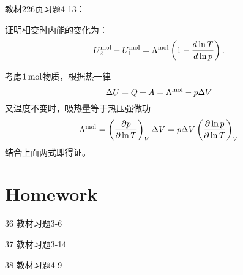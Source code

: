 \documentclass[CJK]{beamer}
\begin{document}
\begin{frame}
  \chtitle{\proid (\stwo)}
  \bch
  教材226页习题4-13：

  证明相变时内能的变化为：
  $$U_2^{\rm mol}-U^{\rm mol}_1 = \Lambda^{\rm mol}\left(1-\frac{d\ln T}{d\ln p}\right).$$
  \ech
\end{frame}


\begin{frame}
  \bch
      {\small
        考虑$1\,\mathrm{mol}$物质，根据热一律
        $$ \Delta U = Q + A = \Lambda^{\rm mol} - p \Delta V$$
        又温度不变时，吸热量等于热压强做功
        $$\Lambda^{\rm mol} = \left(\frac{\partial p}{\partial \ln T}\right)_{V} \Delta V = p\Delta V \left(\frac{\partial \ln p}{\partial \ln T}\right)_{V} $$
        结合上面两式即得证。
      }
  \ech
\end{frame}

\section{Homework}

\begin{frame}
  \bch
  {\small 
    \bitem
\item[36]{教材习题3-6}
\item[37]{教材习题3-14}
\item[38]{教材习题4-9}
  \eitem
  }
  \ech
\end{frame}
\end{document}
